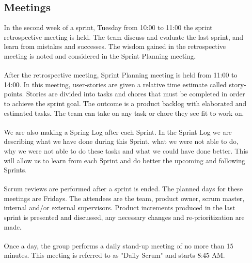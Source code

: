 \subsection{Meetings}
In the second week of a sprint, Tuesday from 10:00 to 11:00 the sprint retrospective meeting is held. The team discuss and evaluate the last sprint, and learn from mistakes and successes. The wisdom gained in the retrospective meeting is noted and considered in the Sprint Planning meeting.
\\\\
After the retrospective meeting, Sprint Planning meeting is held from 11:00 to 14:00. In this meeting, user-stories are given a relative time estimate called  story-points. Stories are divided into  tasks and chores that must be completed in order to achieve the sprint goal. The outcome is a product backlog with elaborated and estimated tasks. The team can take on any task or chore they see fit to work on. 
\\\\
We are also making a Spring Log after each Sprint. In the Sprint Log we are describing what we have done during this Sprint, what we were not able to do, why we were not able to do these tasks and what we could have done better. This will allow us to learn from each Sprint and do better the upcoming and following Sprints. 
\\\\
Scrum reviews are performed after a sprint is ended. The planned days for these meetings are Fridays. The attendees are the team, product owner, scrum master, internal and/or external supervisors. Product increments produced in the last sprint is presented and discussed, any necessary changes and re-prioritization are made.
\\\\
Once a day, the group performs a daily stand-up meeting of no more than 15 minutes. This meeting is referred to as "Daily Scrum" and starts 8:45 AM. 









